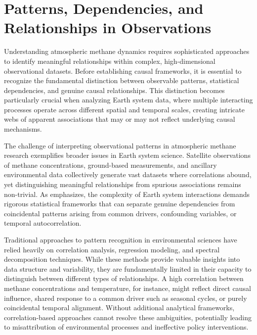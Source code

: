 
\section{Patterns, Dependencies, and Relationships in Observations}

Understanding atmospheric methane dynamics requires sophisticated approaches to identify meaningful relationships within complex, high-dimensional observational datasets. Before establishing causal frameworks, it is essential to recognize the fundamental distinction between observable patterns, statistical dependencies, and genuine causal relationships. This distinction becomes particularly crucial when analyzing Earth system data, where multiple interacting processes operate across different spatial and temporal scales, creating intricate webs of apparent associations that may or may not reflect underlying causal mechanisms.

The challenge of interpreting observational patterns in atmospheric methane research exemplifies broader issues in Earth system science. Satellite observations of methane concentrations, ground-based measurements, and ancillary environmental data collectively generate vast datasets where correlations abound, yet distinguishing meaningful relationships from spurious associations remains non-trivial. As \cite{Runge2019} emphasizes, the complexity of Earth system interactions demands rigorous statistical frameworks that can separate genuine dependencies from coincidental patterns arising from common drivers, confounding variables, or temporal autocorrelation.

Traditional approaches to pattern recognition in environmental sciences have relied heavily on correlation analysis, regression modeling, and spectral decomposition techniques. While these methods provide valuable insights into data structure and variability, they are fundamentally limited in their capacity to distinguish between different types of relationships. A high correlation between methane concentrations and temperature, for instance, might reflect direct causal influence, shared response to a common driver such as seasonal cycles, or purely coincidental temporal alignment. Without additional analytical frameworks, correlation-based approaches cannot resolve these ambiguities, potentially leading to misattribution of environmental processes and ineffective policy interventions.

